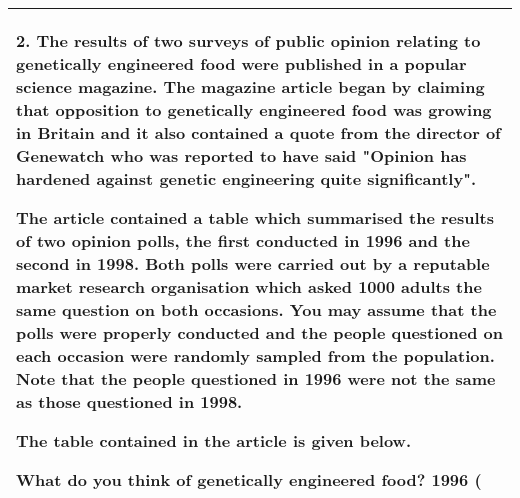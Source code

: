 \documentclass[a4paper,12pt]{article}
\begin{document}
  \begin{table}[ht!]
 \centering
 \begin{tabular}{|p{15cm}|}
 \hline  
2. The results of two surveys of public opinion relating to genetically engineered food were published in a popular science magazine.  The magazine article began by claiming that opposition to genetically engineered food was growing in Britain and it also contained a quote from the director of Genewatch who was reported to have said "Opinion has hardened against genetic engineering quite significantly". 
 
The article contained a table which summarised the results of two opinion polls, the first conducted in 1996 and the second in 1998.  Both polls were carried out by a reputable market research organisation which asked 1000 adults the same question on both occasions.  You may assume that the polls were properly conducted and the people questioned on each occasion were randomly sampled from the population.  Note that the people questioned in 1996 were not the same as those questioned in 1998. 
 
The table contained in the article is given below. 
 
What do you think of genetically engineered food?  1996 (%
 
 
\\ \hline
  \end{tabular}
\end{table}
\end{document}
